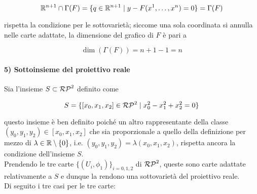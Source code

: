 \begin{equation}
	\mathbb{R}^{n+1} \cap \Gamma(F) = \{ q \in \mathbb{R}^{n+1} \mid y - F(x^{1},\dots,x^{n}) = 0 \} = \Gamma(F)
\end{equation}

rispetta la condizione per le sottovarietà; siccome una sola coordinata si annulla nelle carte adattate, la dimensione del grafico di $ F $ è pari a

\begin{equation}
	\dim(\Gamma(F)) = n+1-1 = n
\end{equation}

\paragraph{5) Sottoinsieme del proiettivo reale}

Sia l'insieme $ S \subset \mathcal{RP}^{2} $ definito come

\begin{equation}
	S = \{ [x_{0},x_{1},x_{2}] \in \mathcal{RP}^{2} \mid x_{0}^{2} - x_{1}^{2} + x_{2}^{2} = 0 \}
\end{equation}

questo insieme è ben definito poiché un altro rappresentante della classe $ (y_{0},y_{1},y_{2}) \in [x_{0},x_{1},x_{2}] $ che sia proporzionale a quello della definizione per mezzo di $ \lambda \in \mathbb{R} \setminus \{0\} $, i.e. $ (y_{0},y_{1},y_{2}) = \lambda (x_{0},x_{1},x_{2}) $, rispetta ancora la condizione dell'insieme $ S $.\\
Prendendo le tre carte $ \{(U_{i},\phi_{1})\}_{i=0,1,2} $ di $ \mathcal{RP}^{2} $, queste sono carte adattate relativamente a $ S $ e dunque la rendono una sottovarietà del proiettivo reale.\\
Di seguito i tre casi per le tre carte:


